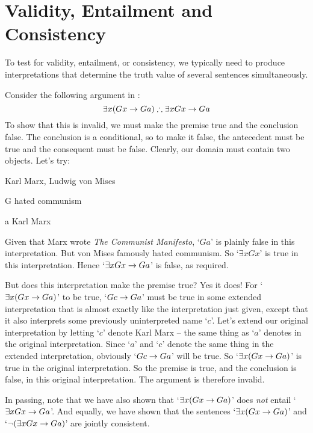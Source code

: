 \section{Validity, Entailment and Consistency}
To test for validity, entailment, or consistency, we typically need to produce interpretations that determine the truth value of several sentences simultaneously. 

Consider the following argument in \FOL:
$$\exists x(Gx \rightarrow Ga) \mathrel{\therefore} \exists x Gx \rightarrow Ga$$
To show that this is invalid, we must make the premise true and the conclusion false. The conclusion is a conditional, so to make it false, the antecedent must be true and the consequent must be false. Clearly, our domain must contain two objects. Let's try:
	\begin{ekey}
		\item[\domain] Karl Marx, Ludwig von Mises
		\item[G]  hated communism
		\item[a] Karl Marx
	\end{ekey}
Given that Marx wrote \emph{The Communist Manifesto}, `$Ga$' is plainly false in this interpretation. But von Mises famously hated communism. So `$\exists x Gx$' is true in this interpretation. Hence `$\exists x Gx \rightarrow Ga$' is false, as required. 

But does this interpretation make the premise true? Yes it does! For `$\exists x (Gx \rightarrow Ga)$' to be true,  `$Gc \rightarrow Ga$' must be true in  some extended interpretation that is almost exactly like the interpretation just given, except that it also interprets some previously uninterpreted name `$c$'. Let's extend our original interpretation by letting `$c$' denote Karl Marx – the same thing as `$a$' denotes in the original interpretation. Since `$a$' and `$c$' denote the same thing in the extended interpretation, obviously `$Gc \rightarrow Ga$' will be true. So `$\exists x (Gx \rightarrow Ga)$' is true in the original interpretation. So the premise is true, and the conclusion is false, in this original interpretation. The argument is therefore invalid. 

In passing, note that we have also shown that `$\exists x(Gx \rightarrow Ga)$' does \emph{not} entail `$\exists x Gx \rightarrow Ga$'. And equally, we have shown that the sentences `$\exists x (Gx \rightarrow Ga)$' and `$\neg (\exists x Gx \rightarrow Ga)$' are jointly consistent.

